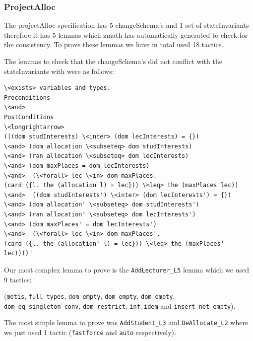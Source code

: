 \subsubsection{ProjectAlloc}

The projectAlloc specification \cite{mathlangexamples} has 5 changeSchema's and 1 set of stateInvariants
therefore it has 5 lemmas which \gls{zmath} has automatically generated to check
for the consistency. To prove these lemmas we have in total used 18 tactics.

The lemmas to check that the changeSchema's did not conflict with
the stateInvariants with were as follows:

\begin{verbatim}
\<exists> variables and types.
Preconditions
\<and>
PostConditions
\<longrightarrow>
(((dom studInterests) \<inter> (dom lecInterests) = {})
\<and> (dom allocation \<subseteq> dom studInterests)
\<and> (ran allocation \<subseteq> dom lecInterests)
\<and> (dom maxPlaces = dom lecInterests)
\<and>  (\<forall> lec \<in> dom maxPlaces.
(card ({l. the (allocation l) = lec})) \<leq> the (maxPlaces lec))
\<and>  ((dom studInterests') \<inter> (dom lecInterests') = {})
\<and> (dom allocation' \<subseteq> dom studInterests')
\<and> (ran allocation' \<subseteq> dom lecInterests')
\<and> (dom maxPlaces' = dom lecInterests')
\<and>  (\<forall> lec \<in> dom maxPlaces'.
(card ({l. the (allocation' l) = lec})) \<leq> the (maxPlaces' lec))))"
\end{verbatim}

Our most complex lemma to prove is the \verb|AddLecturer_L5| lemma which we used
9 tactics:

(\verb|metis|, \verb|full_types|, \verb|dom_empty|, \verb|dom_empty|,
\verb|dom_empty|, \\
 \verb|dom_eq_singleton_conv|, \verb|dom_restrict|,
\verb|inf.idem| and \verb|insert_not_empty|).

The most simple lemma to prove was \verb|AddStudent_L3| and \verb|DeAllocate_L2|
where we just used 1 tactic (\verb|fastforce| and \verb|auto| respectively).

